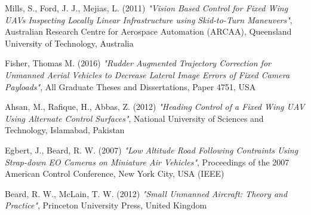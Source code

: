 \begin{thebibliography}{25}
	Mills, S., Ford, J. J., Mejias, L. (2011)
	\emph{"Vision Based Control for Fixed Wing UAVs Inspecting Locally Linear Infrastructure using Skid-to-Turn Maneuvers"}, 
	Australian Research Centre for Aerospace Automation (ARCAA), Queensland University of Technology, Australia
	
	Fisher, Thomas M. (2016)
	\emph{"Rudder Augmented Trajectory Correction for Unmanned Aerial Vehicles to Decrease Lateral Image Errors of Fixed Camera Payloads"},
	All Graduate Theses and Dissertations, Paper 4751, USA
	
	Ahsan, M., Rafique, H., Abbas, Z. (2012)
	\emph{"Heading Control of a Fixed Wing UAV Using Alternate Control Surfaces"},
	National University of Sciences and Technology, Islamabad, Pakistan
	
	Egbert, J., Beard, R. W. (2007)
	\emph{"Low Altitude Road Following Contraints Using Strap-down EO Cameras on Miniature Air Vehicles"},
	Proceedings of the 2007 American Control Conference, New York City, USA (IEEE)
	
	Beard, R. W., McLain, T. W. (2012)
	\emph{"Small Unmanned Aircraft: Theory and Practice"},
	Princeton University Press, United Kingdom
	
\end{thebibliography}